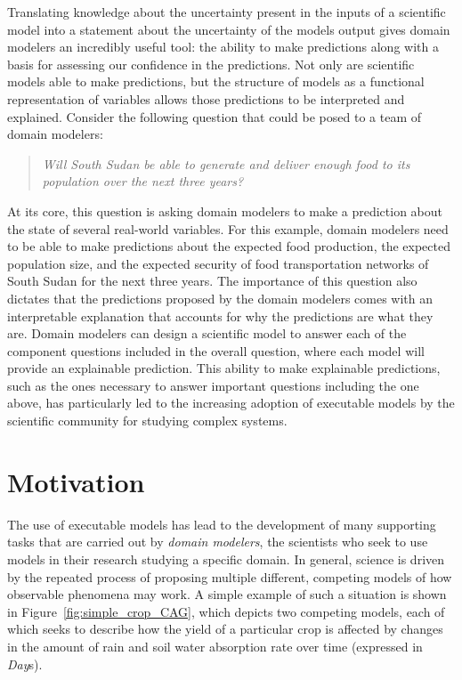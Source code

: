 Translating knowledge about the uncertainty present in the inputs of a scientific model into a statement about the uncertainty of the models output gives domain modelers an incredibly useful tool: the ability to make predictions along with a basis for assessing our confidence in the predictions.
Not only are scientific models able to make predictions, but the structure of models as a functional representation of variables allows those predictions to be interpreted and explained.
Consider the following question that could be posed to a team of domain modelers:
\begin{quote}
\textit{Will South Sudan be able to generate and deliver enough food to its population over the next three years?}
\end{quote}
At its core, this question is asking domain modelers to make a prediction about the state of several real-world variables.
For this example, domain modelers need to be able to make predictions about the expected food production, the expected population size, and the expected security of food transportation networks of South Sudan for the next three years.
The importance of this question also dictates that the predictions proposed by the domain modelers comes with an interpretable explanation that accounts for why the predictions are what they are.
Domain modelers can design a scientific model to answer each of the component questions included in the overall question, where each model will provide an explainable prediction.
This ability to make explainable predictions, such as the ones necessary to answer important questions including the one above, has particularly led to the increasing adoption of executable models by the scientific community for studying complex systems.

\section{Motivation\label{sec:motivation}}
The use of executable models has lead to the development of many supporting tasks that are carried out by \emph{domain modelers}, the scientists who seek to use models in their research studying a specific domain.
In general, science is driven by the repeated process of proposing multiple different, competing models of how observable phenomena may work.
A simple example of such a situation is shown in Figure~\ref{fig:simple_crop_CAG}, which depicts two competing models, each of which seeks to describe how the yield of a particular crop is affected by changes in the amount of rain and soil water absorption rate over time (expressed in \emph{Day}s).

